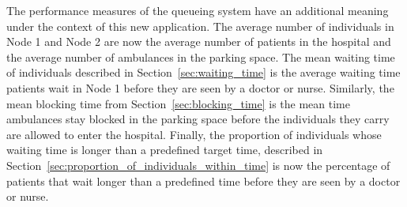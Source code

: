 

The performance measures of the queueing system
have an additional meaning under the context of this new application.
The average number of individuals in Node 1 and Node 2 are now the average
number of patients in the hospital and the average number of ambulances in the
parking space.
The mean waiting time of individuals described in Section~\ref{sec:waiting_time}
is the average waiting time patients wait in Node 1 before they are seen by a
doctor or nurse.
Similarly, the mean blocking time from Section~\ref{sec:blocking_time}
is the mean time ambulances stay blocked in the parking space before the
individuals they carry are allowed to enter the hospital.
Finally, the proportion of individuals whose waiting time is longer than a
predefined target time, described in
Section~\ref{sec:proportion_of_individuals_within_time}
is now the percentage of patients that wait longer than a predefined time
before they are seen by a doctor or nurse.